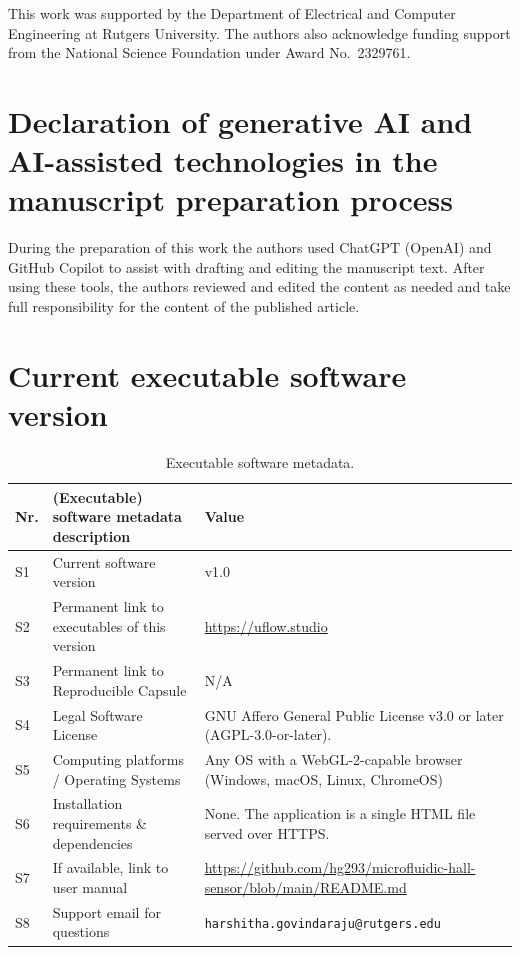 \documentclass[preprint,12pt,a4paper]{elsarticle}
\begin{document}
This work was supported by the Department of Electrical and Computer Engineering at Rutgers University. The authors also acknowledge funding support from the National Science Foundation under Award No.\ 2329761.

\section*{Declaration of generative AI and AI-assisted technologies in the manuscript preparation process}

During the preparation of this work the authors used ChatGPT (OpenAI) and GitHub Copilot to assist with drafting and editing the manuscript text. After using these tools, the authors reviewed and edited the content as needed and take full responsibility for the content of the published article.




\section*{Current executable software version}

\begin{table}[!h]
\centering
\footnotesize
\begin{tabular}{|l|p{6.0cm}|p{6.0cm}|}
\hline
\textbf{Nr.} & \textbf{(Executable) software metadata description} & \textbf{Value} \\
\hline
S1 & Current software version & v1.0 \\
\hline
S2 & Permanent link to executables of this version & \url{https://uflow.studio} \\
\hline
S3 & Permanent link to Reproducible Capsule & N/A \\
\hline
S4 & Legal Software License & GNU Affero General Public License v3.0 or later (AGPL-3.0-or-later). \\
\hline
S5 & Computing platforms / Operating Systems & Any OS with a WebGL-2-capable browser (Windows, macOS, Linux, ChromeOS) \\
\hline
S6 & Installation requirements \& dependencies & None. The application is a single HTML file served over HTTPS. \\
\hline
S7 & If available, link to user manual & \url{https://github.com/hg293/microfluidic-hall-sensor/blob/main/README.md} \\
\hline
S8 & Support email for questions & \texttt{harshitha.govindaraju@rutgers.edu} \\
\hline
\end{tabular}
\caption{Executable software metadata.}
\label{tab:execmeta}
\end{table}
\end{document}
